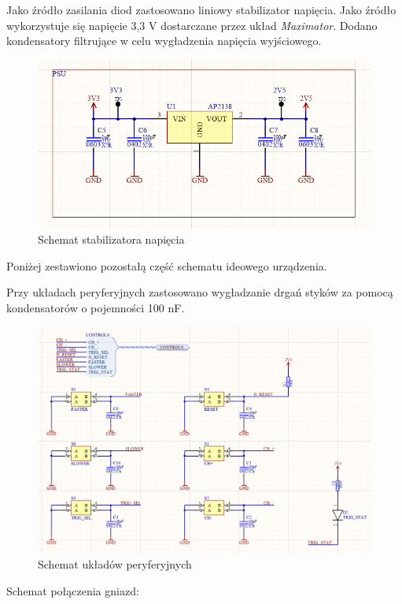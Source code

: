Jako źródło zasilania diod zastosowano liniowy stabilizator napięcia. Jako źródło wykorzystuje się napięcie 3,3 V dostarczane przez układ \textit{Maximator}. Dodano kondensatory filtrujące w celu wygładzenia napięcia wyjściowego. 

\begin{figure}[H]
\begin{center}
\includegraphics[width=3.5 in]{images/psu.png}
\end{center}
\caption{Schemat stabilizatora napięcia}
\label{fig:psu}
\end{figure}

Poniżej zestawiono pozostałą część schematu ideowego urządzenia.

Przy układach peryferyjnych zastosowano wygładzanie drgań styków za pomocą kondensatorów o pojemności 100 nF. 

\begin{figure}[H]
\begin{center}
\includegraphics[width=4.5 in]{images/peripherals.png}
\end{center}
\caption{Schemat układów peryferyjnych}
\label{fig:peripherals}
\end{figure}

Schemat połączenia gniazd:

